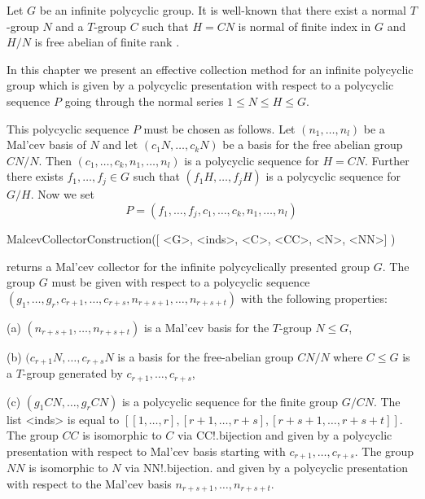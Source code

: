 

Let $G$ be an infinite polycyclic group. It is well-known that
there exist  a normal
${T}$-group $N$ and a ${T}$-group $C$ such that $H=CN$ is normal
of finite
index in $G$ and  $H/N$ is free abelian of finite rank \cite{Seg83}. 

In this chapter
we present an effective collection method for an infinite
polycyclic group which is given by a polycyclic presentation 
with respect
to a polycyclic sequence $P$ going through the normal
series $1 \le N \le H \le G$.

This polycyclic sequence $P$ must be chosen as follows.
Let $(n_1,\dots,n_l)$ be a Mal'cev basis of $N$ and let
$(c_1N,\dots,c_k N)$ be a basis for
the free abelian group $CN/N$.
Then $(c_1,\dots,c_k,n_1,\dots,n_l)$
is a polycyclic sequence for $H=CN$. Further there exists
$f_1,\dots, f_j \in G$ such that $(f_1 H, \dots, f_j H)$ is
a polycyclic sequence for $G/H$. Now we set
$$P = (f_1,\dots,f_j, c_1, \dots , c_k, n_1, \dots, n_l )$$


\> MalcevCollectorConstruction([ <G>, <inds>, <C>, <CC>, <N>, <NN>] )

returns a Mal'cev collector for the infinite polycyclically presented group 
$G$. The group $G$ must be given with respect to a polycyclic sequence 
$(g_1,\dots,g_r, c_{r+1}, \dots, c_{r+s}, n_{r+s+1}, \dots, n_{r+s+t})$
with the following properties:
\beginlist
\item{(a)}
$(n_{r+s+1}, \dots, n_{r+s+t})$ is a Mal'cev basis for the $T$-group 
$N \leq G$,
\item{(b)}  $(c_{r+1}N, \dots, c_{r+s}N$ is a basis for the 
free-abelian group $CN/N$ where $C \leq G$ is a $T$-group generated by 
$ c_{r+1}, \dots, c_{r+s} $, 
\item{(c)}
$(g_1 CN, \dots, g_r CN)$ is a polycyclic sequence for the finite
group $G/CN$.
\endlist 
The list <inds> is equal to 
$[ [1,\dots,r],[r+1,\dots,r+s],[r+s+1,\dots,r+s+t]]$. 
The group $CC$ is isomorphic to $C$ via CC!.bijection 
and given by a polycyclic presentation with respect 
to Mal'cev basis starting with $ c_{r+1}, \dots, c_{r+s}$.
The  group $NN$ is isomorphic to $N$ via NN!.bijection.
and given by a polycyclic presentation with respect 
to the Mal'cev basis $ n_{r+s+1}, \dots, n_{r+s+t}$.


